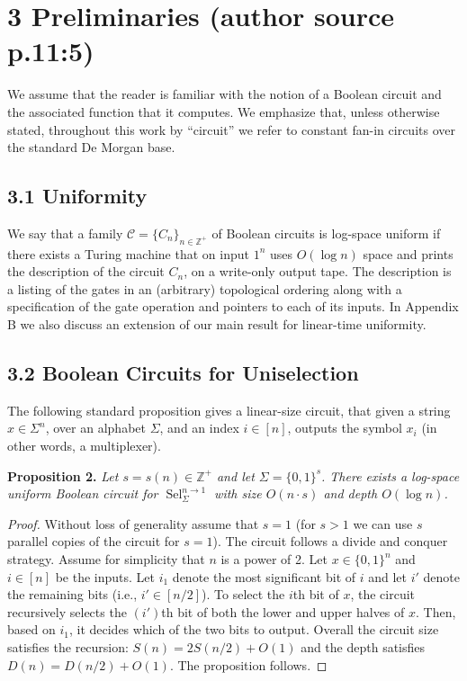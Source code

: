 \documentclass[10pt,a4paper]{article}
\newcommand{\Sel}{\operatorname{Sel}}
\newcommand{\bits}{\{0,1\}}
\newcommand{\ZZ}{\mathbb Z}
\newenvironment{originalresult}[1]{\par\medskip\noindent\textbf{#1.}\itshape}{\par\medskip}
\begin{document}
\section*{3 Preliminaries (author source p.11:5)}
We assume that the reader is familiar with the notion of a Boolean circuit and the associated function that it computes. We emphasize that, unless otherwise stated, throughout this work by ``circuit'' we refer to constant fan-in circuits over the standard De Morgan base.
\subsection*{3.1 Uniformity}
We say that a family $\mathcal C=\{C_n\}_{n\in\ZZ^+}$ of Boolean circuits is log-space uniform if there exists a Turing machine that on input $1^n$ uses $O(\log n)$ space and prints the description of the circuit $C_n$, on a write-only output tape. The description is a listing of the gates in an (arbitrary) topological ordering along with a specification of the gate operation and pointers to each of its inputs. In Appendix B we also discuss an extension of our main result for linear-time uniformity.
\subsection*{3.2 Boolean Circuits for Uniselection}
The following standard proposition gives a linear-size circuit, that given a string $x\in\Sigma^n$, over an alphabet $\Sigma$, and an index $i\in[n]$, outputs the symbol $x_i$ (in other words, a multiplexer).
\begin{originalresult}{Proposition 2}
Let $s=s(n)\in\ZZ^+$ and let $\Sigma=\bits^s$. There exists a log-space uniform Boolean circuit for $\Sel_\Sigma^{n\to1}$ with size $O(n\cdot s)$ and depth $O(\log n)$.
\end{originalresult}
\begin{proof}
Without loss of generality assume that $s=1$ (for $s>1$ we can use $s$ parallel copies of the circuit for $s=1$). The circuit follows a divide and conquer strategy. Assume for simplicity that $n$ is a power of 2. Let $x\in\bits^n$ and $i\in[n]$ be the inputs. Let $i_1$ denote the most significant bit of $i$ and let $i'$ denote the remaining bits (i.e., $i'\in[n/2]$). To select the $i$th bit of $x$, the circuit recursively selects the $(i')$th bit of both the lower and upper halves of $x$. Then, based on $i_1$, it decides which of the two bits to output. Overall the circuit size satisfies the recursion: $S(n)=2S(n/2)+O(1)$ and the depth satisfies $D(n)=D(n/2)+O(1)$. The proposition follows.
\end{proof}
\end{document}
